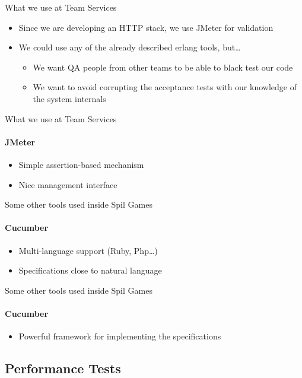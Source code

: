 \documentclass[aspectratio=169]{beamer}
\begin{document}
\begin{frame}{What we use at Team Services}
    \begin{itemize}
    \item Since we are developing an HTTP stack, we use JMeter for validation
    \item We could use any of the already described erlang tools, but\dots
    \pause
        \begin{itemize}
        \item We want QA people from other teams to be able to black test our code
        \item We want to avoid corrupting the acceptance tests with our knowledge of the system internals
        \end{itemize}
    \end{itemize}
\end{frame}

\begin{frame}{What we use at Team Services}
    \framesubtitle{JMeter}
    \begin{itemize}
    \item Simple assertion-based mechanism
    \item Nice management interface
    \end{itemize}
\end{frame}

\begin{frame}{Some other tools used inside Spil Games}
    \framesubtitle{Cucumber}
    \begin{itemize}
    \item Multi-language support (Ruby, Php\dots)
    \item Specifications close to natural language
        
    \end{itemize}
\end{frame}

\begin{frame}{Some other tools used inside Spil Games}
    \framesubtitle{Cucumber}
    \begin{itemize}
    \item Powerful framework for implementing the specifications
        
    \end{itemize}
\end{frame}

\subsection*{Performance Tests}
\label{performance_tests}
\end{document}
